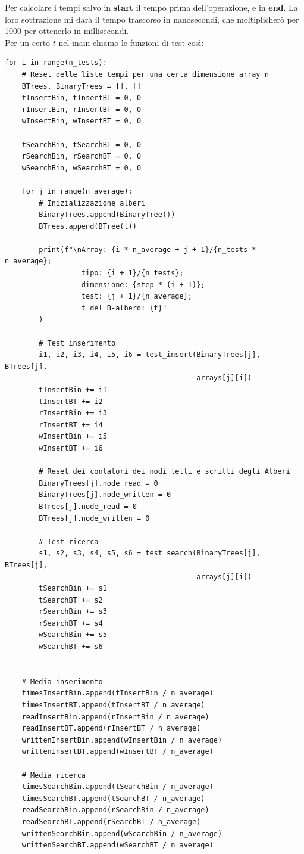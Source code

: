 Per calcolare i tempi salvo in \textbf{start} il tempo prima dell'operazione, e in \textbf{end}. La loro sottrazione mi darà il tempo trascorso in nanosecondi, che moltiplicherò per 1000 per ottenerlo in millisecondi.
\\Per un certo $t$ nel main chiamo le funzioni di test così:
\begin{verbatim}
for i in range(n_tests):
    # Reset delle liste tempi per una certa dimensione array n
    BTrees, BinaryTrees = [], []
    tInsertBin, tInsertBT = 0, 0
    rInsertBin, rInsertBT = 0, 0
    wInsertBin, wInsertBT = 0, 0

    tSearchBin, tSearchBT = 0, 0
    rSearchBin, rSearchBT = 0, 0
    wSearchBin, wSearchBT = 0, 0

    for j in range(n_average):
        # Inizializzazione alberi
        BinaryTrees.append(BinaryTree())
        BTrees.append(BTree(t))

        print(f"\nArray: {i * n_average + j + 1}/{n_tests * n_average};
                  tipo: {i + 1}/{n_tests};
                  dimensione: {step * (i + 1)};
                  test: {j + 1}/{n_average};
                  t del B-albero: {t}"
        )

        # Test inserimento
        i1, i2, i3, i4, i5, i6 = test_insert(BinaryTrees[j], BTrees[j],
                                             arrays[j][i])
        tInsertBin += i1
        tInsertBT += i2
        rInsertBin += i3
        rInsertBT += i4
        wInsertBin += i5
        wInsertBT += i6

        # Reset dei contatori dei nodi letti e scritti degli Alberi
        BinaryTrees[j].node_read = 0
        BinaryTrees[j].node_written = 0
        BTrees[j].node_read = 0
        BTrees[j].node_written = 0

        # Test ricerca
        s1, s2, s3, s4, s5, s6 = test_search(BinaryTrees[j], BTrees[j],
                                             arrays[j][i])
        tSearchBin += s1
        tSearchBT += s2
        rSearchBin += s3
        rSearchBT += s4
        wSearchBin += s5
        wSearchBT += s6
        

    # Media inserimento
    timesInsertBin.append(tInsertBin / n_average)
    timesInsertBT.append(tInsertBT / n_average)
    readInsertBin.append(rInsertBin / n_average)
    readInsertBT.append(rInsertBT / n_average)
    writtenInsertBin.append(wInsertBin / n_average)
    writtenInsertBT.append(wInsertBT / n_average)

    # Media ricerca
    timesSearchBin.append(tSearchBin / n_average)
    timesSearchBT.append(tSearchBT / n_average)
    readSearchBin.append(rSearchBin / n_average)
    readSearchBT.append(rSearchBT / n_average)
    writtenSearchBin.append(wSearchBin / n_average)
    writtenSearchBT.append(wSearchBT / n_average)
\end{verbatim}

